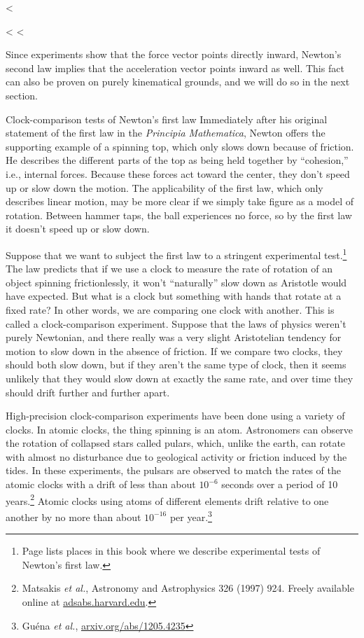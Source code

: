 <%

<%
<%

Since experiments show that the force vector points directly
inward, Newton's second law implies that the acceleration
vector points inward as well. This fact can also be proven
on purely kinematical grounds, and we will do so in the next section.

\begin{eg}{Clock-comparison tests of Newton's first law}\label{eg:clock-comparison-inertia}
Immediately after his original statement of the first 
law in the \emph{Principia Mathematica},
Newton offers the supporting example of a spinning top, which only slows down because of
friction. He describes the different parts of the top as being held together by ``cohesion,''
i.e., internal forces. Because these forces act toward the center, they don't speed up
or slow down the motion. The applicability of the first law, which only describes linear motion,
may be more clear if we simply take figure  as a model of rotation.
Between hammer taps, the ball experiences no force, so by the first law it doesn't speed
up or slow down.

Suppose that we want to subject the first law to 
a stringent experimental test.\footnote{Page \pageref{first-law-evidence} lists places in this
book where we describe experimental tests of Newton's first law.} The law predicts that
if we use a clock to measure the rate of rotation of an object spinning frictionlessly, it won't
``naturally'' slow down as Aristotle would have expected. But what is a clock but something with hands
that rotate at a fixed rate? In other words, we are comparing one clock with another. This is called
a clock-comparison experiment. Suppose that the laws of
physics weren't purely Newtonian, and there really was a very slight Aristotelian tendency for
motion to slow down in the absence of friction. If we compare two clocks, they should both slow
down, but if they aren't the same type of clock,
then it seems unlikely that they would slow down at exactly the same rate, and over time they should
drift further and further apart.

High-precision clock-comparison experiments have been done using a variety of clocks. In atomic clocks,
the thing spinning is an atom. Astronomers can observe the rotation of collapsed stars called pulars,
which, unlike the earth, can rotate with almost no disturbance due to geological activity or friction
induced by the tides. In these experiments, the pulsars are observed to match the rates of the atomic
clocks with a drift of less than about $10^{-6}$ seconds over a 
period of 10 years.\footnote{Matsakis \emph{et al.}, Astronomy and Astrophysics 326 (1997) 924.
Freely available online at \url{adsabs.harvard.edu}.}
Atomic clocks using atoms of different elements drift relative to one another by no more than 
about $10^{-16}$ per year.\footnote{Gu\'{e}na \emph{et al.}, \url{arxiv.org/abs/1205.4235}}


\end{eg}
